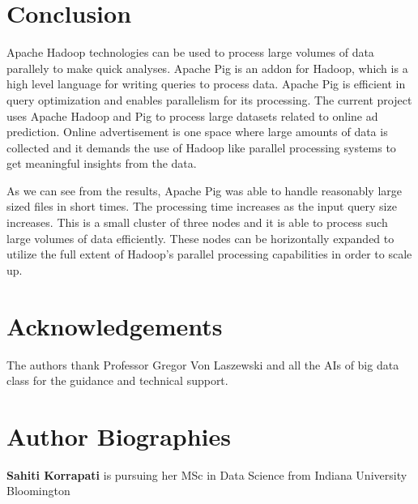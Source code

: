 \documentclass[9pt,twocolumn,twoside]{../../styles/osajnl}
\begin{document}
\section{Conclusion}
Apache Hadoop technologies can be used to process large volumes of data parallely to make quick analyses. Apache Pig is an addon for Hadoop, which is a high level language for writing queries to process data. Apache Pig is efficient in query optimization and enables parallelism for its processing. The current project uses Apache Hadoop and Pig to process large datasets related to online ad prediction. Online advertisement is one space where large amounts of data is collected and it demands the use of Hadoop like parallel processing systems to get meaningful insights from the data. 

As we can see from the results, Apache Pig was able to handle reasonably large sized files in short times. The processing time increases as the input query size increases. This is a small cluster of three nodes and it is able to process such large volumes of data efficiently. These nodes can be horizontally expanded to utilize the full extent of Hadoop's parallel processing capabilities in order to scale up. 

\section*{Acknowledgements}

The authors thank Professor Gregor Von Laszewski and all the AIs of big data class for the guidance and technical support.


 
\section*{Author Biographies}
\begingroup
\setlength\intextsep{0pt}
\begin{minipage}[t][3.2cm][t]{1.0\columnwidth} %
  \noindent
  {\bfseries Sahiti Korrapati} is pursuing her MSc in Data Science from
  Indiana University Bloomington
\end{minipage}
\endgroup
\end{document}
